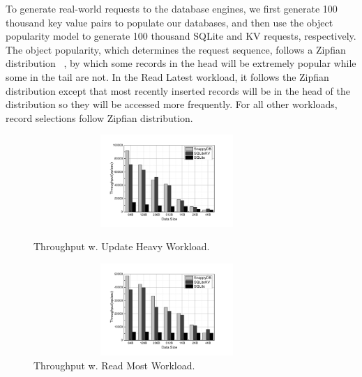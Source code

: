 To generate real-world requests to the database engines, we first generate 100 thousand key value pairs to populate our databases, and then use the object popularity model to generate 100 thousand SQLite and KV requests, respectively. The object popularity, which determines the request sequence, follows a Zipfian distribution ~\cite{shen2017didacache}, by which some records in the head will be extremely popular while some in the tail are not. In the Read Latest workload, it follows the Zipfian distribution except that most recently inserted records will be in the head of the distribution so they will be accessed more frequently. For all other workloads, record selections follow Zipfian distribution. 
\begin{figure}
	\centering
	\begin{minipage}[t]{0.4\textwidth}
		\centering
		\includegraphics[width=0.9\textwidth, height=3.5cm]{Ext/workload1.pdf}
		\vspace*{-0.2cm}
		\caption{\small Throughput w. Update Heavy Workload.}
		\label{fig:workload1}
	\end{minipage}%
	\hspace*{0.7cm}
	\begin{minipage}[t]{0.4\textwidth}
		\centering
		\includegraphics[width=0.9\textwidth, height=3.5cm]{Ext/workload2.pdf}
		\vspace*{-0.2cm}
		\caption{\small Throughput w. Read Most Workload.}
		\label{fig:workload2}
	\end{minipage}
\end{figure}

